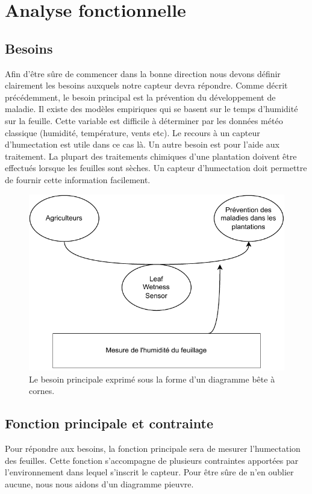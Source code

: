 \graphicspath{ {./figuresAnalysis} }
\section{Analyse fonctionnelle}
\subsection{Besoins}
Afin d'être sûre de commencer dans la bonne direction nous devons définir clairement les besoins auxquels notre capteur devra répondre. Comme décrit précédemment, le besoin principal est la prévention du développement de maladie. Il existe des modèles empiriques qui se basent sur le temps d'humidité sur la feuille. Cette variable est difficile à déterminer par les données météo classique (humidité, température, vents etc). Le recours à un capteur d'humectation est utile dans ce cas là.
Un autre besoin est pour l'aide aux traitement. La plupart des traitements chimiques d'une plantation doivent être effectués lorsque les feuilles sont sèches. Un capteur d'humectation doit permettre de fournir cette information facilement.  

\begin{figure}[!ht]
 \centering
 \includegraphics{DiagrammeCorne.drawio.pdf}
 \caption{Le besoin principale exprimé sous la forme d'un diagramme bête à cornes.}
\end{figure}

\subsection{Fonction principale et contrainte }

Pour répondre aux besoins, la fonction principale sera de mesurer l'humectation des feuilles. Cette fonction s'accompagne de plusieurs contraintes apportées par l’environnement dans lequel s'inscrit le capteur. Pour être sûre de n'en oublier aucune, nous nous aidons d'un diagramme pieuvre. 

